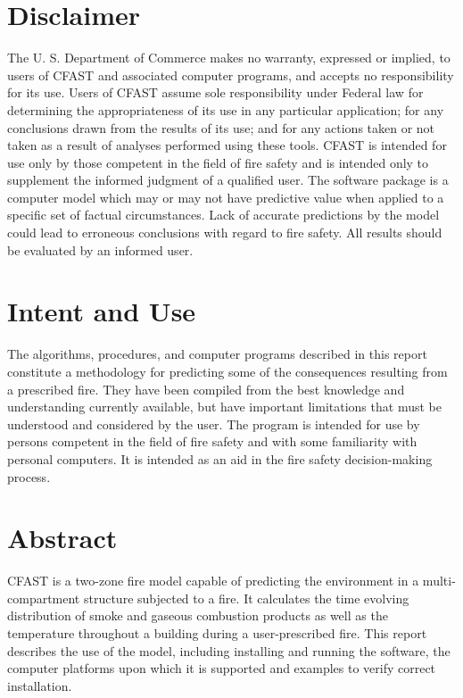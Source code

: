 \documentclass[12pt]{book}
\begin{document}
\newpage

\frontmatter

\pagestyle{plain}
\setcounter{page}{3}

\chapter{Disclaimer}

The U. S. Department of Commerce makes no warranty, expressed or implied, to users of 
CFAST and associated computer programs, and accepts no responsibility for its use.  Users of 
CFAST assume sole responsibility under Federal law for determining the appropriateness of its 
use in any particular application; for any conclusions drawn from the results of its use; and for 
any actions taken or not taken as a result of analyses performed using these tools. 
CFAST is intended for use only by those competent in the field of fire safety and is intended 
only to supplement the informed judgment of a qualified user. The software package is a 
computer model which may or may not have predictive value when applied to a specific set of 
factual circumstances. Lack of accurate predictions by the model could lead to erroneous 
conclusions with regard to fire safety. All results should be evaluated by an informed user.

\chapter{Intent and Use}

The algorithms, procedures, and computer programs described in this report constitute a 
methodology for predicting some of the consequences resulting from a prescribed fire.  They 
have been compiled from the best knowledge and understanding currently available, but have 
important limitations that must be understood and considered by the user.  The program is 
intended for use by persons competent in the field of fire safety and with some familiarity with 
personal computers. It is intended as an aid in the fire safety decision-making process.

\chapter{Abstract}

CFAST is a two-zone fire model capable of predicting the environment in a multi-compartment structure subjected to a fire. It calculates the time evolving distribution of smoke and gaseous combustion products as well as the temperature throughout a building during a user-prescribed fire. This report describes the use of the model, including installing and running the software, the computer platforms upon which it is supported and examples to verify correct installation.
\end{document}
